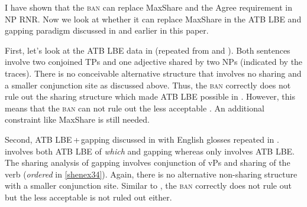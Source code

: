 \documentclass[output=paper]{langscibook}
\begin{document}
I have shown that the \textsc{ban} can replace MaxShare and the Agree requirement in NP RNR. Now we look at whether it can replace MaxShare in the ATB LBE and gapping paradigm discussed in \citet{Citko:2006} and earlier in this paper.

First, let's look at the ATB LBE data in  (repeated from  and ). 
Both sentences involve two conjoined TPs and one adjective shared by two NPs (indicated by the traces). 
There is no conceivable alternative structure that involves no sharing and a smaller conjunction site as discussed above.  
Thus, the \textsc{ban} correctly does not rule out the sharing structure which made ATB LBE possible in . 
However, this means that the \textsc{ban} can not rule out the less acceptable . 
An additional constraint like MaxShare is still needed.

\ea 
	\label{shenex33}
	\z 
\z 
Second, ATB LBE\,+\,gapping discussed in  with English glosses repeated in .  involves both ATB LBE of \textit{which} and gapping whereas  only involves ATB LBE.
The sharing analysis of gapping involves conjunction of vPs and sharing of the verb (\textit{ordered} in \ref{shenex34}). Again, there is no alternative non-sharing structure with a smaller conjunction site. Similar to ,  the \textsc{ban} correctly does not rule out  but the less acceptable  is not ruled out either.
\end{document}
